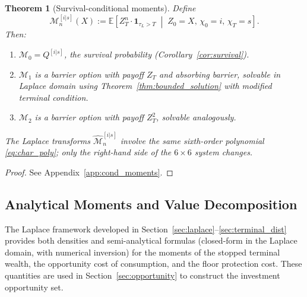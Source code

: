 \documentclass[11pt,a4paper]{article}
\numberwithin{equation}{section}
\newtheorem{theorem}{Theorem}[section]
\newcommand{\E}{\mathbb{E}}
\newcommand{\ind}{\mathbf{1}}
\begin{document}
\begin{theorem}[Survival-conditional moments]\label{thm:cond_moments}
Define
\begin{equation}\label{eq:M_n_def}
\mathcal{M}^{[i|s]}_n(X) := \E\!\left[Z_T^n \cdot \ind_{\tau_L > T} \;\middle|\; Z_0 = X,\, \chi_0 = i,\, \chi_T = s\right].
\end{equation}
Then:
\begin{enumerate}[label=(\alph*)]
\item $\mathcal{M}_0 = Q^{[i|s]}$, the survival probability (Corollary~\ref{cor:survival}).
\item $\mathcal{M}_1$ is a barrier option with payoff $Z_T$ and absorbing barrier, solvable in Laplace domain using Theorem~\ref{thm:bounded_solution} with modified terminal condition.
\item $\mathcal{M}_2$ is a barrier option with payoff $Z_T^2$, solvable analogously.
\end{enumerate}
The Laplace transforms $\hat{\mathcal{M}}^{[i|s]}_n$ involve the same sixth-order polynomial \eqref{eq:char_poly}; only the right-hand side of the $6 \times 6$ system changes.
\end{theorem}

\begin{proof}
See Appendix~\ref{app:cond_moments}.
\end{proof}




\subsection{Analytical Moments and Value Decomposition}\label{sec:client}

The Laplace framework developed in Section~\ref{sec:laplace}--\ref{sec:terminal_dist} provides both densities and semi-analytical formulas (closed-form in the Laplace domain, with numerical inversion) for the moments of the stopped terminal wealth, the opportunity cost of consumption, and the floor protection cost. These quantities are used in Section~\ref{sec:opportunity} to construct the investment opportunity set.
\end{document}
